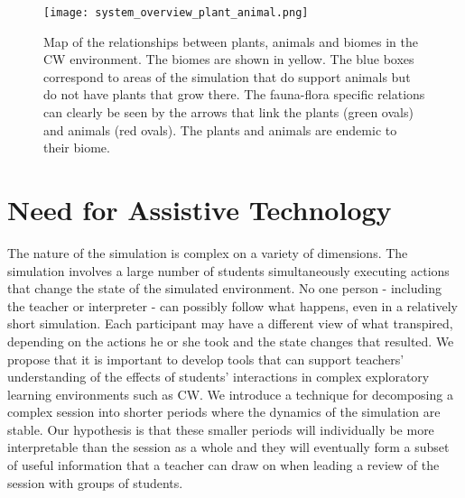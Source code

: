 \begin{figure}
\centering
\texttt{[image: system\_overview\_plant\_animal.png]}
\caption{Map of the relationships between plants, animals and biomes in the CW environment. The biomes are shown in yellow. The blue boxes correspond to areas of the simulation that do support animals but do not have plants that grow there. The fauna-flora specific relations can clearly be seen by the arrows that link the plants (green ovals) and animals (red ovals). The plants and animals are endemic to their biome.}
\label{fig:system_overview_plant_animal}
\end{figure}

\section{Need for Assistive Technology}
The nature of the simulation is complex on a variety of dimensions. The simulation involves a large number of students simultaneously executing actions that change the state of the simulated environment.  No one person - including the teacher or interpreter - can possibly follow what happens, even in a relatively short simulation. Each participant may have a different view of what transpired, depending on the actions he or she took and the state changes that resulted. We propose that it is important to develop tools that can support teachers' understanding of the effects of students' interactions in complex exploratory learning environments such as CW. We introduce a technique for decomposing a complex session into shorter periods where the dynamics of the simulation are stable. Our hypothesis is that these smaller periods will individually be more interpretable than the session as a whole and they will eventually form a subset of useful information that a teacher can draw on when leading a review of the session with groups of students.

